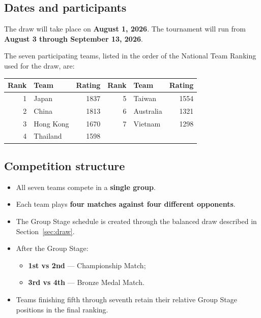 \documentclass[10pt,a4paper]{article}
\newcommand{\term}[1]{\textbf{#1}}
\begin{document}
\subsection{Dates and participants}

The draw will take place on \term{August 1, 2026}. The tournament will run from
\term{August 3 through September 13, 2026}.

The seven participating teams, listed in the order of the National Team Ranking
used for the draw, are:

\begin{center}
\begin{tabular}{r l r@{\qquad}r l r}
  \toprule
  \textbf{Rank} & \textbf{Team} & \textbf{Rating} &
  \textbf{Rank} & \textbf{Team} & \textbf{Rating}\\
  \midrule
  1 & Japan & 1837 & 5 & Taiwan & 1554\\
  2 & China & 1813 & 6 & Australia & 1321\\
  3 & Hong Kong & 1670 & 7 & Vietnam & 1298\\
  4 & Thailand & 1598 & & &\\
  \bottomrule
\end{tabular}
\end{center}

\subsection{Competition structure}

\begin{itemize}
  \item All seven teams compete in a \term{single group}.
  \item Each team plays \term{four matches against four different opponents}.
  \item The Group Stage schedule is created through the balanced draw described
        in Section~\ref{sec:draw}.
  \item After the Group Stage:
    \begin{itemize}
      \item \term{1st vs 2nd} --- Championship Match;
      \item \term{3rd vs 4th} --- Bronze Medal Match.
    \end{itemize}
  \item Teams finishing fifth through seventh retain their relative Group Stage
        positions in the final ranking.
\end{itemize}
\end{document}
